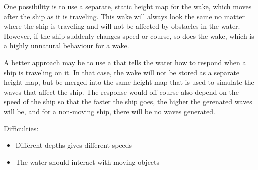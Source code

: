 One possibility is to use a separate, static height map for the wake, which moves after the ship as it is traveling. This wake will always look the same no matter where the ship is traveling and will not be affected by obstacles in the water. However, if the ship suddenly changes speed or course, so does the wake, which is a highly unnatural behaviour for a wake.

A better approach may be to use a  that tells the water how to respond when a ship is traveling on it. In that case, the wake will not be stored as a separate height map, but be merged into the same height map that is used to simulate the waves that affect the ship. The response would off course also depend on the speed of the ship so that the faster the ship goes, the higher the gerenated waves will be, and for a non-moving ship, there will be no waves generated.

Difficulties:
\begin{itemize}
    \item Different depths gives different speeds
    \item The water should interact with moving objects
\end{itemize}